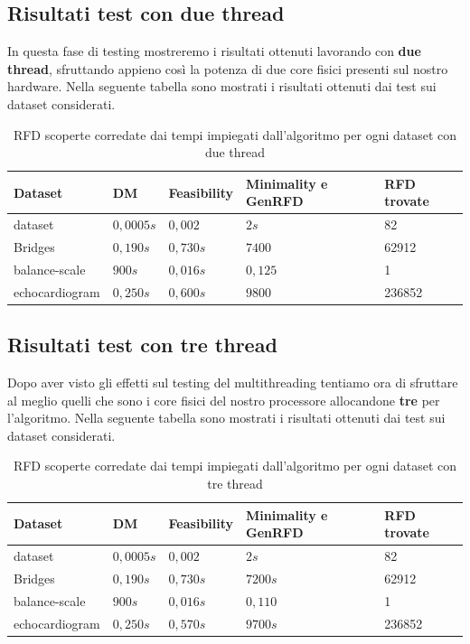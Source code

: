 \subsection{Risultati test con due thread}
In questa fase di testing mostreremo i risultati ottenuti lavorando con \textbf{due thread}, sfruttando appieno così la potenza di due core fisici presenti sul nostro hardware.
Nella seguente tabella sono mostrati i risultati ottenuti dai test sui dataset considerati.
\begin{table}[H]
	\centering
	\begin{tabular}{lllll}
		Dataset & DM & Feasibility & Minimality e GenRFD & RFD trovate \\
		\hline
		dataset& $0,0005s$ & $0,002$ & $2s$ & 82 \\
		Bridges & $0,190s$  & $0,730s$ & $7400$ & 62912 \\
		balance-scale  & $900s$  & $0,016s$ & $0,125$ & 1\\
		echocardiogram  & $0,250s$  & $0,600s$ & $9800$ & 236852\\
		\hline
	\end{tabular}
	\label{risultati_2_thread}
	\caption{RFD scoperte corredate dai tempi impiegati dall'algoritmo per ogni dataset con due thread}
\end{table}
\subsection{Risultati test con tre thread}
Dopo aver visto gli effetti sul testing del multithreading tentiamo ora di sfruttare al meglio quelli che sono i core fisici del nostro processore allocandone \textbf{tre} per l'algoritmo.
Nella seguente tabella sono mostrati i risultati ottenuti dai test sui dataset considerati.
\begin{table}[H]
	\centering
	\begin{tabular}{lllll}
		Dataset & DM & Feasibility & Minimality e GenRFD & RFD trovate \\
		\hline
		dataset& $0,0005s$ & $0,002$ & $2s$ & 82 \\
		Bridges & $0,190s$  & $0,730s$ & $7200s$ & 62912 \\
		balance-scale  & $900s$  & $0,016s$ & $0,110$ & 1\\
		echocardiogram  & $0,250s$  & $0,570s$ & $9700s$ & 236852\\
		\hline
	\end{tabular}
	\label{risultati_3_thread}
	\caption{RFD scoperte corredate dai tempi impiegati dall'algoritmo per ogni dataset con tre thread}
\end{table}
